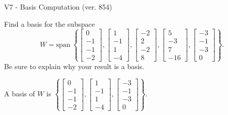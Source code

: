 \begin{exercise}
  \begin{exerciseTitle}V7 - Basis Computation (ver. 854)\end{exerciseTitle}
  \begin{exerciseStatement}
    Find a basis for the subspace 
\[W=\mathrm{span}\ \left\{\left[\begin{array}{r}
0 \\
-1 \\
-1 \\
-2
\end{array}\right] , \left[\begin{array}{r}
1 \\
-1 \\
1 \\
-4
\end{array}\right] , \left[\begin{array}{r}
-2 \\
2 \\
-2 \\
8
\end{array}\right] , \left[\begin{array}{r}
5 \\
-3 \\
7 \\
-16
\end{array}\right] , \left[\begin{array}{r}
-3 \\
-1 \\
-3 \\
0
\end{array}\right]\right\}.\]
 Be sure to explain why your result is a basis.


  \end{exerciseStatement}
  \begin{exerciseAnswer}
   A basis of \(W\) is  \(\left\{\left[\begin{array}{r}
0 \\
-1 \\
-1 \\
-2
\end{array}\right] , \left[\begin{array}{r}
1 \\
-1 \\
1 \\
-4
\end{array}\right] , \left[\begin{array}{r}
-3 \\
-1 \\
-3 \\
0
\end{array}\right]\right\}\).
  


  \end{exerciseAnswer}
\end{exercise}